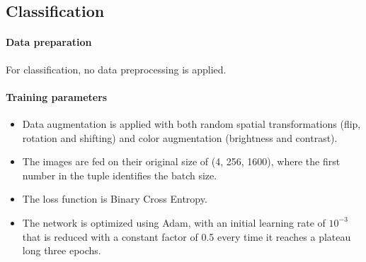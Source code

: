\documentclass[10pt,twocolumn,letterpaper]{article}
\begin{document}
   \subsection{Classification}
      \paragraph{Data preparation} 
         For classification, no data preprocessing is applied.
                 
      \paragraph{Training parameters}
      \begin{itemize}
         \item Data augmentation is applied with both random spatial transformations (flip, rotation and shifting) and color augmentation (brightness and contrast).
         \item The images are fed on their original size of (4, 256, 1600), where the first number in the tuple identifies the batch size.
         \item The loss function is Binary Cross Entropy. 
         \item The network is optimized using Adam, with an initial learning rate of $ 10^{-3} $ that is reduced with a constant factor of 0.5 every time it reaches a plateau long three epochs.
      \end{itemize}
\end{document}
